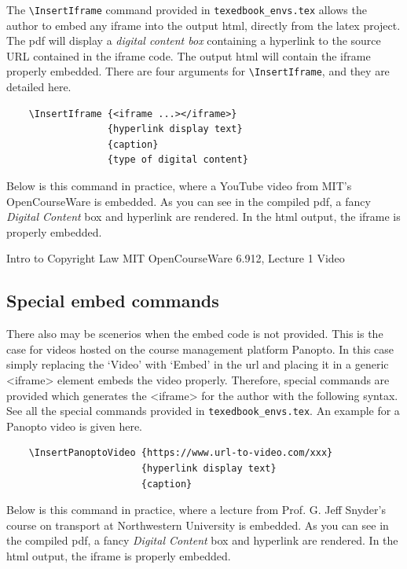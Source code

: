 \documentclass{article}
\begin{document}
The \verb'\InsertIframe' command provided in \verb'texedbook_envs.tex' allows the author to embed any iframe into the output html, directly from the latex project. The pdf will display a \textit{digital content box} containing a hyperlink to the source URL contained in the iframe code. The output html will contain the iframe properly embedded. There are four arguments for \verb'\InsertIframe', and they are detailed here.
\begin{verbatim}
    \InsertIframe {<iframe ...></iframe>}
                  {hyperlink display text}
                  {caption}
                  {type of digital content}
\end{verbatim}  

Below is this command in practice, where a YouTube video from MIT's OpenCourseWare is embedded. As you can see in the compiled pdf, a fancy \textit{Digital Content} box and hyperlink are rendered. In the html output, the iframe is properly embedded.

             {Intro to Copyright Law}
             {MIT OpenCourseWare 6.912, Lecture 1}
             {Video} 

\subsection{Special embed commands}
There also may be scenerios when the embed code is not provided. This is the case for videos hosted on the course management platform Panopto. In this case simply replacing the `Video' with `Embed' in the url and placing it in a generic <iframe> element embeds the video properly. Therefore, special commands are provided which generates the <iframe> for the author with the following syntax. See all the special commands provided in \verb'texedbook_envs.tex'. An example for a Panopto video is given here.
\begin{verbatim}
    \InsertPanoptoVideo {https://www.url-to-video.com/xxx}
                        {hyperlink display text}
                        {caption}
\end{verbatim}  

Below is this command in practice, where a lecture from Prof. G. Jeff Snyder's course on transport at Northwestern University is embedded. As you can see in the compiled pdf, a fancy \textit{Digital Content} box and hyperlink are rendered. In the html output, the iframe is properly embedded.
\end{document}
